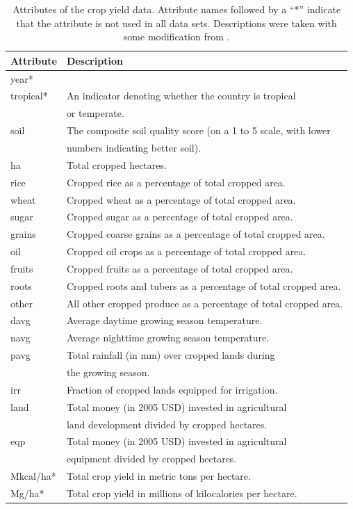 \documentclass[11pt]{article}
\begin{document}
\begin{table}[h!]
\centering
\begin{tabular}{ll}
\toprule
\textbf{Attribute} & \textbf{Description} \\
\midrule
year* & \\
tropical* & An indicator denoting whether the country is tropical \\
& or temperate. \\
soil & The composite soil quality score (on a 1 to 5 scale, with lower \\
& numbers indicating better soil). \\
ha & Total cropped hectares. \\
rice & Cropped rice as a percentage of total cropped area. \\
wheat & Cropped wheat as a percentage of total cropped area.\\
sugar & Cropped sugar as a percentage of total cropped area.\\
grains & Cropped coarse grains as a percentage of total cropped area.\\
oil & Cropped oil crops as a percentage of total cropped area.\\
fruits & Cropped fruits as a percentage of total cropped area.\\
roots & Cropped roots and tubers as a percentage of total cropped area.\\
other & All other cropped produce as a percentage of total cropped area. \\
davg & Average daytime growing season temperature. \\
navg & Average nighttime growing season temperature. \\
pavg & Total rainfall (in mm) over cropped lands during \\
& the growing season. \\
irr & Fraction of cropped lands equipped for irrigation. \\
land & Total money (in 2005 USD) invested in agricultural \\
& land development divided by cropped hectares. \\
eqp & Total money (in 2005 USD) invested in agricultural \\
&  equipment divided by cropped hectares. \\
Mkcal/ha* & Total crop yield in metric tons per hectare. \\
Mg/ha* & Total crop yield in millions of kilocalories per hectare. \\
\bottomrule 
\end{tabular}
\caption{Attributes of the crop yield data. Attribute names followed by a ``*'' indicate that the attribute is not used in all data sets. Descriptions were taken with some modification from \cite{nelson_measuring_2016}.}
\label{crop_attributes}
\end{table}
\end{document}
